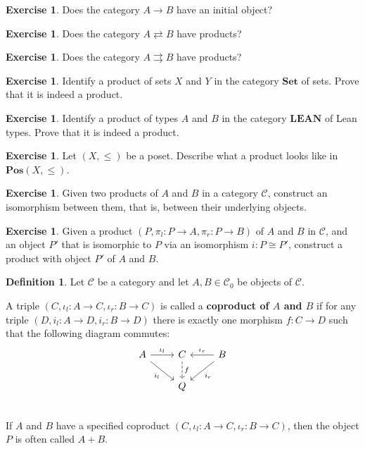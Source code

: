 \documentclass[a4paper,10pt]{scrartcl}
\theoremstyle{plain}
\theoremstyle{definition}
\newtheorem{dfn}[thm]{Definition}
\newtheorem{exer}[thm]{Exercise}
\newcommand{\Cat}[1]{\mathcal{#1}}
\newcommand{\CC}{\Cat{C}}
\newcommand{\Catb}[1]{\mathbf{#1}}
\newcommand{\SET}{\Catb{Set}}
\newcommand{\POS}{\Catb{Pos}}
\newcommand{\LEAN}{\Catb{LEAN}}
\newcommand{\Ob}[1]{{#1}_0}
\newcommand{\inl}{\ensuremath{\iota_l}}
\newcommand{\inr}{\ensuremath{\iota_r}}
\newcommand{\projl}{\ensuremath{\pi_l}}
\newcommand{\projr}{\ensuremath{\pi_r}}
\begin{document}
\begin{exer}
  Does the category $A \to B$ have an initial object?
\end{exer}

\begin{exer}
  Does the category $A \rightleftarrows B$ have products?
\end{exer}

\begin{exer}
  Does the category $A \rightrightarrows B$ have products?
\end{exer}


\begin{exer}
  Identify a product of sets $X$ and $Y$ in the category $\SET$ of sets.
  Prove that it is indeed a product.
\end{exer}

\begin{exer}
  Identify a product of types $A$ and $B$ in the category $\LEAN$ of Lean types.
  Prove that it is indeed a product.
\end{exer}

\begin{exer}
  Let $(X,\leq)$ be a poset. Describe what a product looks like in  $\POS(X,\leq)$.
\end{exer}

\begin{exer}\label{exer:product-unique}
  Given two products of $A$ and $B$ in a category $\CC$, construct an isomorphism between them, that is, between their underlying objects.
\end{exer}

\begin{exer}
  Given a product $(P,\projl : P \to A ,\projr : P \to B)$ of $A$ and $B$ in $\CC$, and an object $P'$ that is isomorphic to $P$ via an isomorphism $i : P \cong P'$, construct a product with object $P'$ of $A$ and $B$.
\end{exer}

\begin{dfn}
   Let $\CC$ be a category and let $A,B \in \Ob\CC$ be objects of $\CC$.

  A triple $(C,\inl : A \to C,\inr : B \to C)$ is called a \textbf{coproduct of $A$ and $B$} if for any triple $(D,i_l : A \to D, i_r : B \to D)$ there is exactly one morphism $f : C \to D$ such that the following diagram commutes:
  \[
    \begin{tikzcd}
      A \ar[r, "\inl"] \ar[rd, "i_l"']
      &
      C  \ar[d, dashed, "f"]
      &
      B \ar[l, "\inr"'] \ar[ld, "i_r"]
      \\
      &
      Q %
      &
      \\
    \end{tikzcd}
  \]
  If $A$ and $B$ have a specified coproduct $(C,\inl : A \to C,\inr : B \to C)$, then the object $P$ is often called $A + B$.
\end{dfn}
\end{document}
